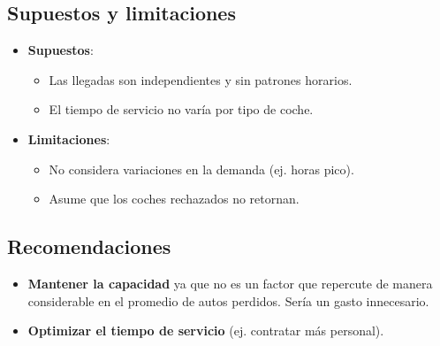 \documentclass{article}
\begin{document}
\subsection{Supuestos y limitaciones}
\begin{itemize}
    \item \textbf{Supuestos}:
    \begin{itemize}
        \item Las llegadas son independientes y sin patrones horarios.
        \item El tiempo de servicio no varía por tipo de coche.
    \end{itemize}
    \item \textbf{Limitaciones}:
    \begin{itemize}
        \item No considera variaciones en la demanda (ej. horas pico).
        \item Asume que los coches rechazados no retornan.
    \end{itemize}
\end{itemize}

\subsection{Recomendaciones}
\begin{itemize}
    \item \textbf{Mantener la capacidad} ya que no es un factor que repercute de manera considerable en el promedio de autos perdidos. Sería un gasto innecesario.
    \item \textbf{Optimizar el tiempo de servicio} (ej. contratar más personal).
\end{itemize}
\end{document}
